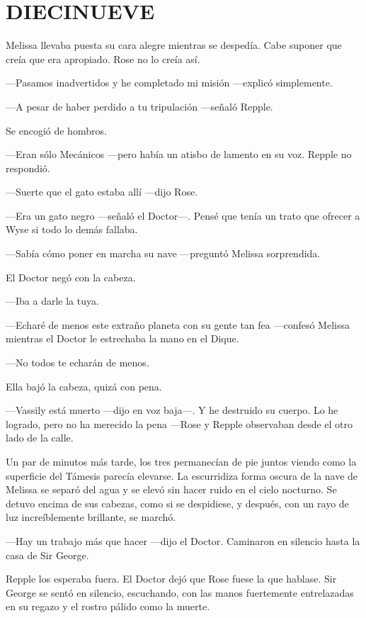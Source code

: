 \chapter*{DIECINUEVE}

{Melissa llevaba puesta su cara alegre mientras se despedía. Cabe
suponer que creía que era apropiado. Rose no lo creía así.}

{---Pasamos inadvertidos y he completado mi misión ---explicó
simplemente.}

{---A pesar de haber perdido a tu tripulación ---señaló Repple.}

{Se encogió de hombros.}

{---Eran sólo Mecánicos ---pero había un atisbo de lamento en su voz.
Repple no respondió.}

{---Suerte que el gato estaba allí ---dijo Rose.}

{---Era un gato negro ---señaló el Doctor---. Pensé que tenía un trato
que ofrecer a Wyse si todo lo demás fallaba.}

{---Sabía cómo poner en marcha su nave ---preguntó Melissa sorprendida.}

{El Doctor negó con la cabeza.}

{---Iba a darle la tuya.}

{---Echaré de menos este extraño planeta con su gente tan fea ---confesó
Melissa mientras el Doctor le estrechaba la mano en el Dique.}

{---No todos te echarán de menos.}

{Ella bajó la cabeza, quizá con pena.}

{---Vassily está muerto ---dijo en voz baja---. Y he destruido su
	cuerpo. Lo he logrado, pero no ha merecido la pena ---Rose y Repple
observaban desde el otro lado de la calle.}

{Un par de minutos más tarde, los tres permanecían de pie juntos viendo
	como la superficie del Támesis parecía elevarse. La escurridiza forma
	oscura de la nave de Melissa se separó del agua y se elevó sin hacer
	ruido en el cielo nocturno. Se detuvo encima de sus cabezas, como si se
	despidiese, y después, con un rayo de luz increíblemente brillante, se
marchó.}

{---Hay un trabajo más que hacer ---dijo el Doctor. Caminaron en
silencio hasta la casa de Sir George.}

\mbox{}

{Repple los esperaba fuera. El Doctor dejó que Rose fuese la que
	hablase. Sir George se sentó en silencio, escuchando, con las manos
	fuertemente entrelazadas en su regazo y el rostro pálido como la
muerte.}

